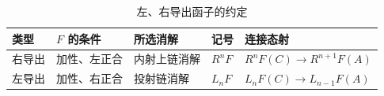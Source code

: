 \begin{table}[htbp]
	\centering
	\caption{左、右导出函子的约定}
	\label{b4:tab:derived-conventions}
	\begin{tabular}{@{}lllll@{}}
		\toprule
		类型 & \(F\) 的条件 & 所选消解 & 记号 & 连接态射 \\
		\midrule
		右导出 & 加性、左正合 & 内射上链消解 & \(R^nF\) & \(R^nF(C)\to R^{n+1}F(A)\) \\
		左导出 & 加性、右正合 & 投射链消解 & \(L_nF\) & \(L_nF(C)\to L_{n-1}F(A)\) \\
		\bottomrule
	\end{tabular}
\end{table}
